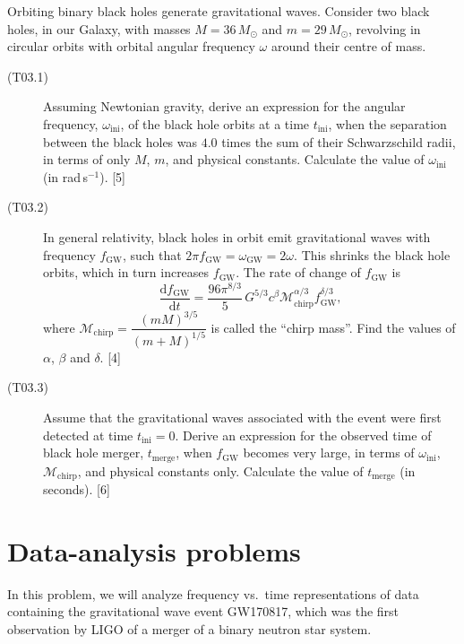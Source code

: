 
Orbiting binary black holes generate gravitational waves. Consider two black
holes, in our Galaxy, with masses $M = 36\,M_\odot$ and $m = 29\,M_\odot$,
revolving in circular orbits with orbital angular frequency $\omega$ around
their centre of mass.

\begin{description}
\item[(T03.1)] Assuming Newtonian gravity, derive an expression for the angular
  frequency, $\omega_{\mathrm{ini}}$, of the black hole orbits at a time
  $t_{\mathrm{ini}}$, when the separation between the black holes was $4.0$
  times the sum of their Schwarzschild radii, in terms of only $M$, $m$, and
  physical constants. Calculate the value of $\omega_{\mathrm{ini}}$
  (in rad\,s$^{-1}$). \hfill[5]
\item[(T03.2)] In general relativity, black holes in orbit emit gravitational
  waves with frequency $f_{\mathrm{GW}}$, such that
  $2\pi f_{\mathrm{GW}} = \omega_{\mathrm{GW}} = 2\omega$. This shrinks the
  black hole orbits, which in turn increases $f_{\mathrm{GW}}$. The rate of
  change of $f_{\mathrm{GW}}$ is
  \[ \frac{\mathrm{d}f_{\mathrm{GW}}}{\mathrm{d}t}
     = \frac{96\pi^{8/3}}{5}\,G^{5/3} c^{\beta}
       \mathcal{M}_{\mathrm{chirp}}^{\alpha/3} f_{\mathrm{GW}}^{\delta/3}, \]
  where $\mathcal{M}_{\mathrm{chirp}} = \dfrac{(mM)^{3/5}}{(m+M)^{1/5}}$ is
  called the ``chirp mass''. Find the values of $\alpha$, $\beta$ and $\delta$.
  \hfill[4]
\item[(T03.3)] Assume that the gravitational waves associated with the event
  were first detected at time $t_{\mathrm{ini}} = 0$. Derive an expression for
  the observed time of black hole merger, $t_{\mathrm{merge}}$, when
  $f_{\mathrm{GW}}$ becomes very large, in terms of $\omega_{\mathrm{ini}}$,
  $\mathcal{M}_{\mathrm{chirp}}$, and physical constants only. Calculate the
  value of $t_{\mathrm{merge}}$ (in seconds). \hfill[6]
\end{description}

\section*{Data-analysis problems}

In this problem, we will analyze frequency vs.\ time representations of data
containing the gravitational wave event GW170817, which was the first
observation by LIGO of a merger of a binary neutron star system.


